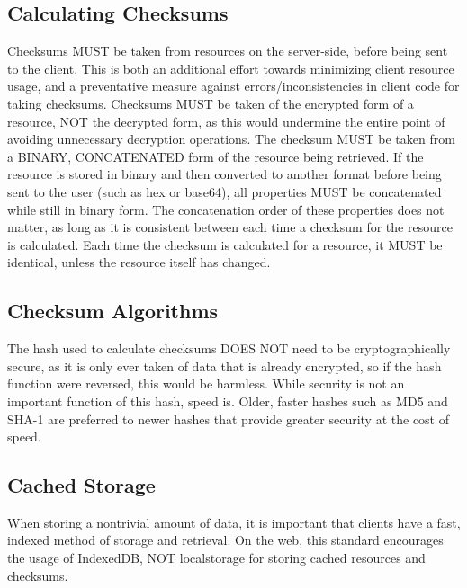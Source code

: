 \documentclass{article}
\begin{document}
\subsection{Calculating Checksums}
Checksums MUST be taken from resources on the server-side, before being sent to the client. This is both an additional effort towards minimizing client resource usage, and a preventative measure against errors/inconsistencies in client code for taking checksums. Checksums MUST be taken of the encrypted form of a resource, NOT the decrypted form, as this would undermine the entire point of avoiding unnecessary decryption operations. The checksum MUST be taken from a BINARY, CONCATENATED form of the resource being retrieved. If the resource is stored in binary and then converted to another format before being sent to the user (such as hex or base64), all properties MUST be concatenated while still in binary form. The concatenation order of these properties does not matter, as long as it is consistent between each time a checksum for the resource is calculated. Each time the checksum is calculated for a resource, it MUST be identical, unless the resource itself has changed.

\subsection{Checksum Algorithms}
The hash used to calculate checksums DOES NOT need to be cryptographically secure, as it is only ever taken of data that is already encrypted, so if the hash function were reversed, this would be harmless. While security is not an important function of this hash, speed is. Older, faster hashes such as MD5 and SHA-1 are preferred to newer hashes that provide greater security at the cost of speed.

\subsection{Cached Storage}
When storing a nontrivial amount of data, it is important that clients have a fast, indexed method of storage and retrieval. On the web, this standard encourages the usage of IndexedDB, NOT localstorage for storing cached resources and checksums.
\end{document}
